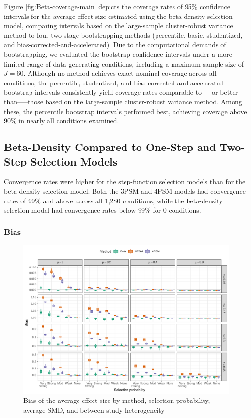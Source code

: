 \documentclass[
  american,
  man, donotrepeattitle,floatsintext]{apa7}
\begin{document}
Figure \ref{fig:Beta-coverage-main} depicts the coverage rates of 95\% confidence intervals for the average effect size estimated using the beta-density selection model, comparing intervals based on the large-sample cluster-robust variance method to four two-stage bootstrapping methods (percentile, basic, studentized, and bias-corrected-and-accelerated).
Due to the computational demands of bootstrapping, we evaluated the bootstrap confidence intervals under a more limited range of data-generating conditions, including a maximum sample size of \(J = 60\).
Although no method achieves exact nominal coverage across all conditions, the percentile, studentized, and bias-corrected-and-accelerated bootstrap intervals consistently yield coverage rates comparable to-----or better than-----those based on the large-sample cluster-robust variance method.
Among these, the percentile bootstrap intervals performed best, achieving coverage above 90\% in nearly all conditions examined.

\subsection{Beta-Density Compared to One-Step and Two-Step Selection Models}\label{beta-density-compared-to-one-step-and-two-step-selection-models}

Convergence rates were higher for the step-function selection models than for the beta-density selection model. Both the 3PSM and 4PSM models had convergence rates of 99\% and above across all 1,280 conditions, while the beta-density selection model had convergence rates below 99\% for 0 conditions.

\subsubsection{Bias}\label{bias-1}

\begin{figure}
\includegraphics{beta-function-selection-models-with-dependent-effects_files/figure-latex/mu-bias-miss-1} \caption{Bias of the average effect size by method, selection probability, average SMD, and between-study heterogeneity}\label{fig:mu-bias-miss}
\end{figure}
\end{document}
